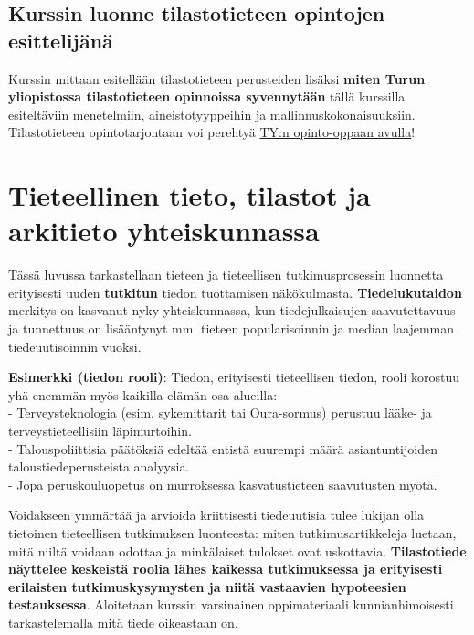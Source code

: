\documentclass[
]{book}
\begin{document}
\hypertarget{kurssin-luonne-tilastotieteen-opintojen-esittelijuxe4nuxe4}{%
\section{Kurssin luonne tilastotieteen opintojen esittelijänä}\label{kurssin-luonne-tilastotieteen-opintojen-esittelijuxe4nuxe4}}

Kurssin mittaan esitellään tilastotieteen perusteiden lisäksi \textbf{miten Turun yliopistossa tilastotieteen opinnoissa syvennytään} tällä kurssilla esiteltäviin menetelmiin, aineistotyyppeihin ja mallinnuskokonaisuuksiin. Tilastotieteen opintotarjontaan voi perehtyä \href{https://opas.peppi.utu.fi/fi/ohjelma/89589}{TY:n opinto-oppaan avulla}!

\hypertarget{luku2}{%
\chapter{Tieteellinen tieto, tilastot ja arkitieto yhteiskunnassa}\label{luku2}}

Tässä luvussa tarkastellaan tieteen ja tieteellisen tutkimusprosessin luonnetta erityisesti uuden \textbf{tutkitun} tiedon tuottamisen näkökulmasta. \textbf{Tiedelukutaidon} merkitys on kasvanut nyky-yhteiskunnassa, kun tiedejulkaisujen saavutettavuus ja tunnettuus on lisääntynyt mm. tieteen popularisoinnin ja median laajemman tiedeuutisoinnin vuoksi.

\begin{eblock}{}
\textbf{Esimerkki (tiedon rooli)}: Tiedon, erityisesti tieteellisen tiedon, rooli korostuu yhä enemmän myös kaikilla elämän osa-alueilla:\\
- Terveysteknologia (esim. sykemittarit tai Oura-sormus) perustuu lääke- ja terveystieteellisiin läpimurtoihin.\\
- Talouspoliittisia päätöksiä edeltää entistä suurempi määrä asiantuntijoiden taloustiedeperusteista analyysia.\\
- Jopa peruskouluopetus on murroksessa kasvatustieteen saavutusten myötä.

\end{eblock}

Voidakseen ymmärtää ja arvioida kriittisesti tiedeuutisia tulee lukijan olla tietoinen tieteellisen tutkimuksen luonteesta: miten tutkimusartikkeleja luetaan, mitä niiltä voidaan odottaa ja minkälaiset tulokset ovat uskottavia. \textbf{Tilastotiede näyttelee keskeistä roolia lähes kaikessa tutkimuksessa ja erityisesti erilaisten tutkimuskysymysten ja niitä vastaavien hypoteesien testauksessa}. Aloitetaan kurssin varsinainen oppimateriaali kunnianhimoisesti tarkastelemalla mitä tiede oikeastaan on.
\end{document}

